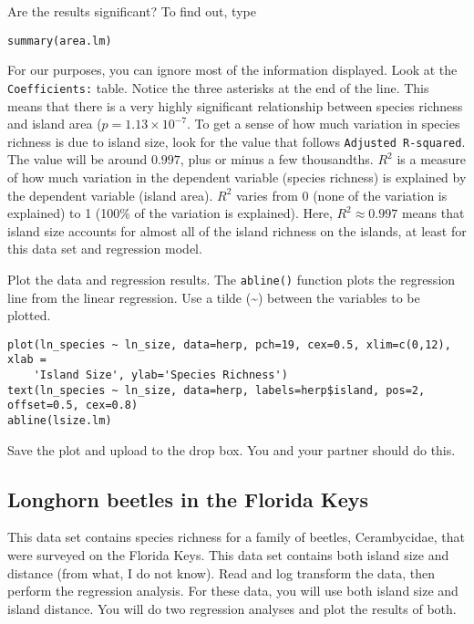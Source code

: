 \documentclass[11pt]{article}
\begin{document}
Are the results significant?  To find out, type

\begin{verbatim}
summary(area.lm)

\end{verbatim}

For our purposes, you can ignore most of the information displayed.  Look at the \texttt{Coefficients:} table. Notice the three asterisks at the end of the line.  This means that there is a very highly significant relationship between species richness and island area ($p = 1.13 \times 10^{-7}$.  To get a sense of how much variation in species richness is due to island size, look for the value that follows \texttt{Adjusted R-squared}. The value will be around $0.997$, plus or minus a few thousandths.  $R^2$ is a measure of how much variation in the dependent variable (species richness) is explained by the dependent variable (island area). $R^2$ varies from 0 (none of the variation is explained) to 1 (100\% of the variation is explained). Here, $R^2 \approx 0.997$ means that island size accounts for almost all of the island richness on the islands, at least for this data set and regression model.

Plot the data and regression results.  The \texttt{abline()} function plots the regression line from the linear regression.  Use a tilde (\textasciitilde) between the variables to be plotted.

\begin{verbatim}
plot(ln_species ~ ln_size, data=herp, pch=19, cex=0.5, xlim=c(0,12), xlab = 
    'Island Size', ylab='Species Richness')
text(ln_species ~ ln_size, data=herp, labels=herp$island, pos=2, offset=0.5, cex=0.8)
abline(lsize.lm)
\end{verbatim}

Save the plot and upload to the drop box. You and your partner should do this.


\subsection*{Longhorn beetles in the Florida Keys}

This data set contains species richness for a family of beetles, Cerambycidae, that were surveyed on the Florida Keys. This data set contains both island size and distance (from what, I do not know).  Read and log transform the data, then perform the regression analysis.  For these data, you will use both island size and island distance.  You will do two regression analyses and plot the results of both.
\end{document}
